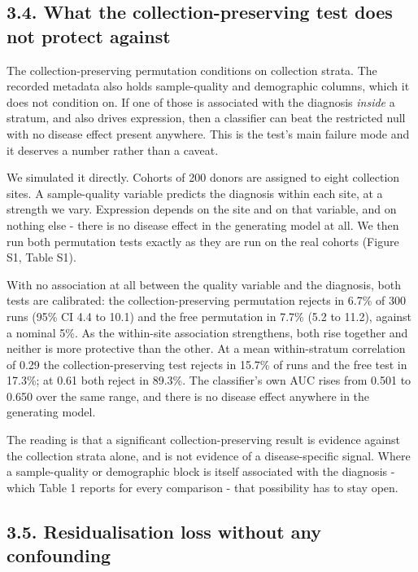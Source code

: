 \subsection{3.4. What the collection-preserving test does not protect against}\label{what-the-collection-preserving-test-does-not-protect-against}

The collection-preserving permutation conditions on collection strata. The recorded metadata also holds sample-quality and demographic columns, which it does not condition on. If one of those is associated with the diagnosis \emph{inside} a stratum, and also drives expression, then a classifier can beat the restricted null with no disease effect present anywhere. This is the test's main failure mode and it deserves a number rather than a caveat.

We simulated it directly. Cohorts of 200 donors are assigned to eight collection sites. A sample-quality variable predicts the diagnosis within each site, at a strength we vary. Expression depends on the site and on that variable, and on nothing else - there is no disease effect in the generating model at all. We then run both permutation tests exactly as they are run on the real cohorts (Figure S1, Table S1).

With no association at all between the quality variable and the diagnosis, both tests are calibrated: the collection-preserving permutation rejects in 6.7\% of 300 runs (95\% CI 4.4 to 10.1) and the free permutation in 7.7\% (5.2 to 11.2), against a nominal 5\%. As the within-site association strengthens, both rise together and neither is more protective than the other. At a mean within-stratum correlation of 0.29 the collection-preserving test rejects in 15.7\% of runs and the free test in 17.3\%; at 0.61 both reject in 89.3\%. The classifier's own AUC rises from 0.501 to 0.650 over the same range, and there is no disease effect anywhere in the generating model.

The reading is that a significant collection-preserving result is evidence against the collection strata alone, and is not evidence of a disease-specific signal. Where a sample-quality or demographic block is itself associated with the diagnosis - which Table 1 reports for every comparison - that possibility has to stay open.

\subsection{3.5. Residualisation loss without any confounding}\label{residualisation-loss-without-any-confounding}


